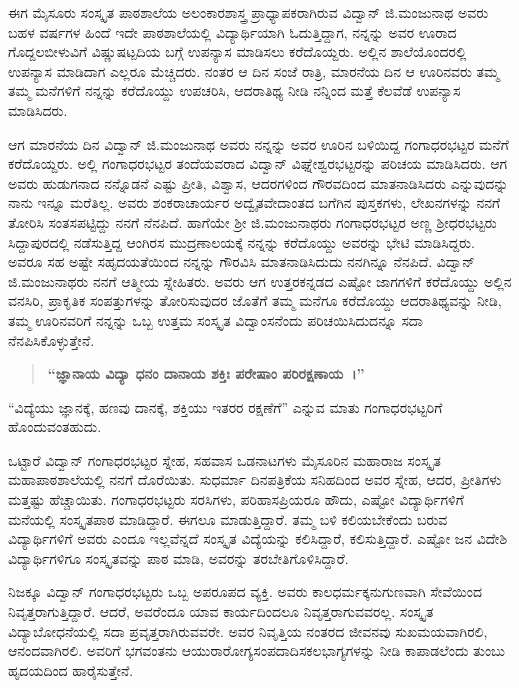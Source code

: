 {ಈಗ ಮೈಸೂರು ಸಂಸ್ಕೃತ ಪಾಠಶಾಲೆಯ ಅಲಂಕಾರಶಾಸ್ತ್ರ ಪ್ರಾಧ್ಯಾಪಕರಾಗಿರುವ ವಿದ್ವಾನ್ ಜಿ.ಮಂಜುನಾಥ ಅವರು ಬಹಳ ವರ್ಷಗಳ ಹಿಂದೆ ಇದೇ ಪಾಠಶಾಲೆಯಲ್ಲಿ ವಿದ್ಯಾರ್ಥಿಯಾಗಿ ಓದುತ್ತಿದ್ದಾಗ, ನನ್ನನ್ನು ಅವರ ಊರಾದ ಗೊದ್ದಲಬೀಳುವಿಗೆ ವಿಷ್ಣುಷಟ್ಪದಿಯ ಬಗ್ಗೆ ಉಪನ್ಯಾಸ ಮಾಡಿಸಲು ಕರೆದೊಯ್ದರು. ಅಲ್ಲಿನ ಶಾಲೆಯೊಂದರಲ್ಲಿ ಉಪನ್ಯಾಸ ಮಾಡಿದಾಗ ಎಲ್ಲರೂ ಮೆಚ್ಚಿದರು. ನಂತರ ಆ ದಿನ ಸಂಜೆ ರಾತ್ರಿ, ಮಾರನೆಯ ದಿನ ಆ ಊರಿನವರು ತಮ್ಮ ತಮ್ಮ ಮನೆಗಳಿಗೆ ನನ್ನನ್ನು ಕರೆದೊಯ್ದು ಉಪಚರಿಸಿ, ಆದರಾತಿಥ್ಯ ನೀಡಿ ನನ್ನಿಂದ ಮತ್ತೆ ಕೆಲವೆಡೆ ಉಪನ್ಯಾಸ ಮಾಡಿಸಿದರು. 
\eject

ಆಗ ಮಾರನೆಯ ದಿನ ವಿದ್ವಾನ್ ಜಿ.ಮಂಜುನಾಥ ಅವರು ನನ್ನನ್ನು ಅವರ ಊರಿನ ಬಳಿಯಿದ್ದ ಗಂಗಾಧರಭಟ್ಟರ ಮನೆಗೆ ಕರೆದೊಯ್ದರು. ಅಲ್ಲಿ ಗಂಗಾಧರಭಟ್ಟರ ತಂದೆ\-ಯವರಾದ ವಿದ್ವಾನ್ ವಿಘ್ನೇಶ್ವರಭಟ್ಟರನ್ನು ಪರಿಚಯ ಮಾಡಿಸಿದರು. ಆಗ ಅವರು ಹುಡುಗನಾದ ನನ್ನೊಡನೆ ಎಷ್ಟು ಪ್ರೀತಿ, ವಿಶ್ವಾಸ, ಆದರಗಳಿಂದ ಗೌರವದಿಂದ ಮಾತ\-ನಾಡಿಸಿದರು ಎನ್ನುವುದನ್ನು ನಾನು ಇನ್ನೂ ಮರೆತಿಲ್ಲ. ಅವರು ಶಂಕರಾಚಾರ್ಯರ ಅದ್ವೈತವೇದಾಂತದ ಬಗೆಗಿನ ಪುಸ್ತಕಗಳು, ಲೇಖನಗಳನ್ನು ನನಗೆ ತೋರಿಸಿ ಸಂತಸ\-ಪಟ್ಟಿದ್ದು ನನಗೆ ನೆನಪಿದೆ. ಹಾಗೆಯೇ ಶ್ರೀ ಜಿ.ಮಂಜುನಾಥರು ಗಂಗಾಧರಭಟ್ಟರ ಅಣ್ಣ ಶ್ರೀಧರಭಟ್ಟರು ಸಿದ್ದಾಪುರದಲ್ಲಿ ನಡೆಸುತ್ತಿದ್ದ ಆಂಗಿರಸ ಮುದ್ರಣಾಲಯಕ್ಕೆ ನನ್ನನ್ನು ಕರೆದೊಯ್ದು ಅವರನ್ನು ಭೇಟಿ ಮಾಡಿಸಿದ್ದರು. ಅವರೂ ಸಹ ಅಷ್ಟೇ ಸಹೃದಯತೆಯಿಂದ ನನ್ನನ್ನು ಗೌರವಿಸಿ ಮಾತನಾಡಿಸಿದುದು ನನಗಿನ್ನೂ ನೆನಪಿದೆ. ವಿದ್ವಾನ್ ಜಿ.ಮಂಜುನಾಥರು ನನಗೆ ಆತ್ಮೀಯ ಸ್ನೇಹಿತರು. ಅವರು ಆಗ ಉತ್ತರಕನ್ನಡದ ಎಷ್ಟೋ ಜಾಗಗಳಿಗೆ ಕರೆದೊಯ್ದು ಅಲ್ಲಿನ ವನಸಿರಿ, ಪ್ರಾಕೃತಿಕ ಸಂಪತ್ತುಗಳನ್ನು ತೋರಿಸುವುದರ ಜೊತೆಗೆ ತಮ್ಮ ಮನೆಗೂ ಕರೆದೊಯ್ದು ಆದರಾತಿಥ್ಯವನ್ನು ನೀಡಿ, ತಮ್ಮ ಊರಿನವರಿಗೆ ನನ್ನನ್ನು ಒಬ್ಬ ಉತ್ತಮ ಸಂಸ್ಕೃತ ವಿದ್ವಾಂಸನೆಂದು ಪರಿಚಯಿಸಿದುದನ್ನೂ ಸದಾ ನೆನಪಿಸಿಕೊಳ್ಳುತ್ತೇನೆ.
\begin{verse}
\textbf{“ಜ್ಞಾನಾಯ ವಿದ್ಯಾ ಧನಂ ದಾನಾಯ ಶಕ್ತಿಃ ಪರೇಷಾಂ ಪರಿರಕ್ಷಣಾಯ~।”}
\end{verse}
“ವಿದ್ಯೆಯು ಜ್ಞಾನಕ್ಕೆ, ಹಣವು ದಾನಕ್ಕೆ, ಶಕ್ತಿಯು ಇತರರ ರಕ್ಷಣೆಗೆ” ಎನ್ನುವ ಮಾತು ಗಂಗಾಧರಭಟ್ಟರಿಗೆ ಹೊಂದುವಂತಹುದು.

ಒಟ್ಟಾರೆ ವಿದ್ವಾನ್ ಗಂಗಾಧರಭಟ್ಟರ ಸ್ನೇಹ, ಸಹವಾಸ ಒಡನಾಟಗಳು ಮೈಸೂರಿನ ಮಹಾರಾಜ ಸಂಸ್ಕೃತ ಮಹಾಪಾಠಶಾಲೆಯಲ್ಲಿ ನನಗೆ ದೊರೆಯಿತು. ಸುಧರ್ಮಾ ದಿನ\-ಪತ್ರಿಕೆಯ ಸನಿಹದಿಂದ ಅವರ ಸ್ನೇಹ, ಆದರ, ಪ್ರೀತಿಗಳು ಮತ್ತಷ್ಟು ಹೆಚ್ಚಾಯಿತು. ಗಂಗಾಧರಭಟ್ಟರು ಸರಸಿಗಳು, ಪರಿಹಾಸಪ್ರಿಯರೂ ಹೌದು, ಎಷ್ಟೋ ವಿದ್ಯಾರ್ಥಿಗಳಿಗೆ ಮನೆಯಲ್ಲಿ ಸಂಸ್ಕೃತಪಾಠ ಮಾಡಿದ್ದಾರೆ. ಈಗಲೂ ಮಾಡುತ್ತಿದ್ದಾರೆ. ತಮ್ಮ ಬಳಿ ಕಲಿಯಬೇಕೆಂದು ಬರುವ ವಿದ್ಯಾರ್ಥಿಗಳಿಗೆ ಅವರು ಎಂದೂ ಇಲ್ಲವೆನ್ನದೆ ಸಂಸ್ಕೃತ ವಿದ್ಯೆಯನ್ನು ಕಲಿಸಿದ್ದಾರೆ, ಕಲಿಸುತ್ತಿದ್ದಾರೆ. ಎಷ್ಟೋ ಜನ ವಿದೇಶಿ ವಿದ್ಯಾರ್ಥಿಗಳಿಗೂ ಸಂಸ್ಕೃತವನ್ನು ಪಾಠ ಮಾಡಿ, ಅವರನ್ನು ತರಬೇತಿಗೊಳಿಸಿದ್ದಾರೆ. 

ನಿಜಕ್ಕೂ ವಿದ್ವಾನ್ ಗಂಗಾಧರಭಟ್ಟರು ಒಬ್ಬ ಅಪರೂಪದ ವ್ಯಕ್ತಿ. ಅವರು ಕಾಲ\-ಧರ್ಮಕ್ಕನುಗುಣವಾಗಿ ಸೇವೆಯಿಂದ ನಿವೃತ್ತರಾಗುತ್ತಿದ್ದಾರೆ. ಆದರೆ, ಅವರೆಂದೂ ಯಾವ ಕಾರ್ಯದಿಂದಲೂ ನಿವೃತ್ತರಾಗುವವರಲ್ಲ. ಸಂಸ್ಕೃತ ವಿದ್ಯಾಬೋಧನೆಯಲ್ಲಿ ಸದಾ ಪ್ರವೃತ್ತರಾಗಿರುವವರೇ. ಅವರ ನಿವೃತ್ತಿಯ ನಂತರದ ಜೀವನವು ಸುಖಮಯ\-ವಾಗಿರಲಿ, ಆನಂದವಾಗಿರಲಿ. ಅವರಿಗೆ ಭಗವಂತನು ಆಯುರಾರೋಗ್ಯಸಂಪದಾದಿ\-ಸಕಲಭಾಗ್ಯಗಳನ್ನು ನೀಡಿ ಕಾಪಾಡಲೆಂದು ತುಂಬು ಹೃದಯದಿಂದ ಹಾರೈಸುತ್ತೇನೆ.

\articleend
}
